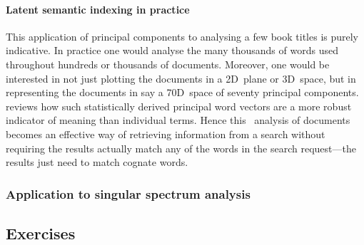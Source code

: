\paragraph{Latent semantic indexing in practice}
This application of principal components to analysing a few book titles is purely indicative.
In practice one would analyse the many thousands of words used throughout hundreds or thousands of documents. 
Moreover, one would be interested in not just plotting the documents in a 2D~plane or 3D~space, but in representing the documents in say a 70D~space of seventy principal components.
\cite{Berry95} reviews how such statistically derived principal word vectors are a more robust indicator of meaning than individual terms.  
Hence this \svd\ analysis of documents becomes an effective way of retrieving information from a search without requiring the results actually match any of the words in the search request---the results just need to match cognate words.









\begin{draft}
\subsubsection {Application to singular spectrum analysis}
\label{sec:ssa}

\begin{comment}
Follow up Example~\ref{eg:orthbapp} on the \textsc{soi} to introduce the use of singular spectrum analysis. 
\end{comment}

\end{draft}









\subsection{Exercises}


